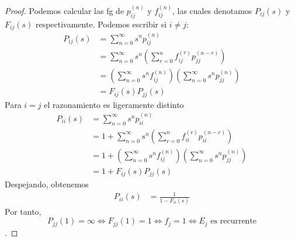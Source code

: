 \documentclass[PREyA.tex]{subfiles}
\begin{document}
\begin{proof}
Podemos calcular las fg de $p_{ij}^{(n)}$ y $f_{ij}^{(n)}$, las cuales denotamos $P_{ij}(s)$ y $F_{ij}(s)$ respectivamente. Podemos escribir si $i\neq j$:
\begin{align*}
P_{ij}(s) &= \sum_{n=0}^\infty s^n p_{ij}^{(n)}\\
&= \sum_{n=0}^\infty s^n \left(\sum_{r=0}^{n}f_{ij}^{(r)}p_{jj}^{(n-r)}\right)\\
&=  \left(\sum_{n=0}^\infty s^n f_{ij}^{(n)}\right)\left( \sum_{n=0}^\infty s^n p_{jj}^{(n)}\right)\\
&=  F_{ij}(s)P_{jj}(s)
\end{align*}
Para $i=j$ el razonamiento es ligeramente distinto
\begin{align*}
P_{ii}(s) &= \sum_{n=0}^\infty s^n p_{ii}^{(n)}\\
&= 1+\sum_{n=0}^\infty s^n \left(\sum_{r=0}^{n}f_{ii}^{(r)}p_{ii}^{(n-r)}\right)\\
&= 1+ \left(\sum_{n=0}^\infty s^n f_{ij}^{(n)}\right)\left( \sum_{n=0}^\infty s^n p_{jj}^{(n)}\right)\\
&=  1 + F_{ij}(s)P_{jj}(s)
\end{align*}
Despejando, obtenemos
\begin{align*}
P_{ii}(s) &= \frac{1}{1-F_{ii}(s)} 
\end{align*}
Por tanto, $$P_{jj}(1)=\infty \Leftrightarrow  F_{jj}(1)=1 \Leftrightarrow f_j = 1 \Leftrightarrow \text{$E_j$ es recurrente}$$ .
\end{proof}
\end{document}
